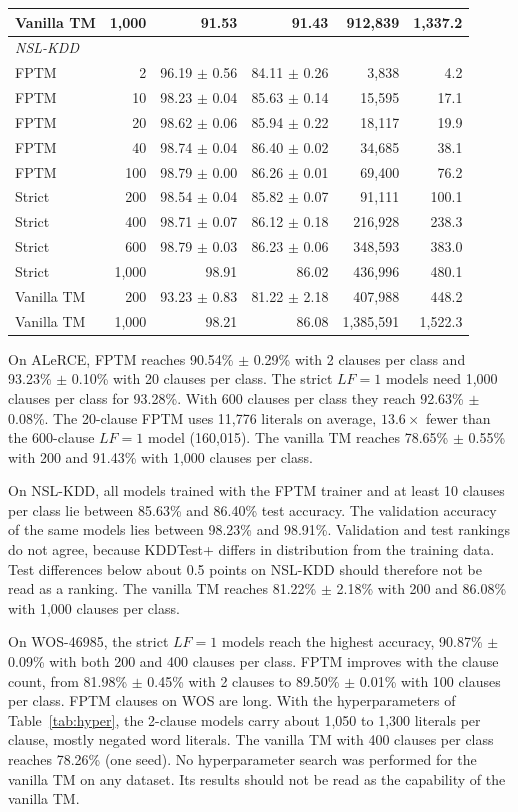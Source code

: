 \documentclass[preprint,review,12pt]{elsarticle}
\newcommand{\LF}{\mathit{LF}}
\begin{document}
\begin{table}[!htbp]
\begin{tabular}{lrrrrr}
Vanilla TM & 1,000 & 91.53 & 91.43 & 912,839 & 1,337.2 \\
\midrule
\multicolumn{6}{l}{\textit{NSL-KDD}} \\
FPTM & 2 & 96.19 $\pm$ 0.56 & 84.11 $\pm$ 0.26 & 3,838 & 4.2 \\
FPTM & 10 & 98.23 $\pm$ 0.04 & 85.63 $\pm$ 0.14 & 15,595 & 17.1 \\
FPTM & 20 & 98.62 $\pm$ 0.06 & 85.94 $\pm$ 0.22 & 18,117 & 19.9 \\
FPTM & 40 & 98.74 $\pm$ 0.04 & 86.40 $\pm$ 0.02 & 34,685 & 38.1 \\
FPTM & 100 & 98.79 $\pm$ 0.00 & 86.26 $\pm$ 0.01 & 69,400 & 76.2 \\
Strict & 200 & 98.54 $\pm$ 0.04 & 85.82 $\pm$ 0.07 & 91,111 & 100.1 \\
Strict & 400 & 98.71 $\pm$ 0.07 & 86.12 $\pm$ 0.18 & 216,928 & 238.3 \\
Strict & 600 & 98.79 $\pm$ 0.03 & 86.23 $\pm$ 0.06 & 348,593 & 383.0 \\
Strict & 1,000 & 98.91 & 86.02 & 436,996 & 480.1 \\
Vanilla TM & 200 & 93.23 $\pm$ 0.83 & 81.22 $\pm$ 2.18 & 407,988 & 448.2 \\
Vanilla TM & 1,000 & 98.21 & 86.08 & 1,385,591 & 1,522.3 \\
\bottomrule
\end{tabular}
\end{table}

On ALeRCE, FPTM reaches 90.54\% $\pm$ 0.29\% with 2 clauses per class and 93.23\% $\pm$ 0.10\% with 20 clauses per class.
The strict $\LF=1$ models need 1,000 clauses per class for 93.28\%. With 600 clauses per class they reach 92.63\% $\pm$ 0.08\%.
The 20-clause FPTM uses 11,776 literals on average, $13.6\times$ fewer than the 600-clause $\LF=1$ model (160,015).
The vanilla TM reaches 78.65\% $\pm$ 0.55\% with 200 and 91.43\% with 1,000 clauses per class.

On NSL-KDD, all models trained with the FPTM trainer and at least 10 clauses per class lie between 85.63\% and 86.40\% test accuracy.
The validation accuracy of the same models lies between 98.23\% and 98.91\%. Validation and test rankings do not agree, because KDDTest+ differs in distribution from the training data.
Test differences below about 0.5 points on NSL-KDD should therefore not be read as a ranking.
The vanilla TM reaches 81.22\% $\pm$ 2.18\% with 200 and 86.08\% with 1,000 clauses per class.

On WOS-46985, the strict $\LF=1$ models reach the highest accuracy, 90.87\% $\pm$ 0.09\% with both 200 and 400 clauses per class.
FPTM improves with the clause count, from 81.98\% $\pm$ 0.45\% with 2 clauses to 89.50\% $\pm$ 0.01\% with 100 clauses per class.
FPTM clauses on WOS are long. With the hyperparameters of Table~\ref{tab:hyper}, the 2-clause models carry about 1,050 to 1,300 literals per clause, mostly negated word literals.
The vanilla TM with 400 clauses per class reaches 78.26\% (one seed).
No hyperparameter search was performed for the vanilla TM on any dataset. Its results should not be read as the capability of the vanilla TM.
\end{document}
